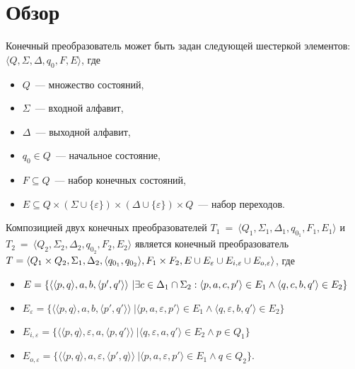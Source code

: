 \section{Обзор}
Конечный преобразователь может быть задан следующей шестеркой элементов: $\langle Q, \Sigma, \Delta, q_0, F, E \rangle$, где

\begin{itemize}
\item $Q$~--- множество состояний, 
\item $\Sigma$~--- входной алфавит, 
\item $\Delta$~--- выходной алфавит, 
\item $q_0 \in Q$~--- начальное состояние, 
\item $F \subseteq Q$~--- набор конечных состояний, 
\item $E \subseteq Q \times (\Sigma \cup \{\varepsilon\}) \times (\Delta \cup \{\varepsilon\})  \times Q$~--- набор переходов. 
\end{itemize}

Композицией двух конечных преобразователей $T_1~=~\langle Q_1, \Sigma_1, \Delta_1, q_{0_{1}}, F_1, E_1 \rangle$ и $T_2~=~\langle Q_2, \Sigma_2, \Delta_2, q_{0_{2}}, F_2, E_2 \rangle$ является конечный преобразователь  $T =\langle Q_1  \times Q_2, \Sigma_1, \Delta_2, \\ \langle q_{0_{1}}, q_{0_{2}} \rangle, F_1 \times F_2, E \cup E_{\varepsilon} \cup E_{i,\varepsilon} \cup E_{o,\varepsilon} \rangle$, где 

\begin{itemize}
\item $E = \{ \langle \langle p, q \rangle, a, b, \langle p', q' \rangle \rangle\ | \exists c \in \Delta_1 \cap \Sigma_2 : \langle p, a, c, p' \rangle \in E_1 \wedge \\\langle q, c, b, q' \rangle \in E_2\}$
\item $E_{\varepsilon} = \{ \langle \langle p, q \rangle, a, b, \langle p', q' \rangle \rangle\ | \langle p, a, {\varepsilon}, p' \rangle \in E_1 \wedge \langle q, {\varepsilon}, b, q' \rangle \in E_2\}$
\item $E_{i, \varepsilon} = \{ \langle \langle p, q \rangle, {\varepsilon}, a, \langle p, q' \rangle \rangle\ | \langle q, {\varepsilon}, a, q' \rangle \in E_2 \wedge p \in Q_1 \} $
\item $E_{o, \varepsilon} = \{ \langle \langle p, q \rangle,  a, {\varepsilon}, \langle p', q \rangle \rangle\ | \langle p, a, {\varepsilon}, p' \rangle \in E_1 \wedge q \in Q_2 \}. $
\end{itemize}

